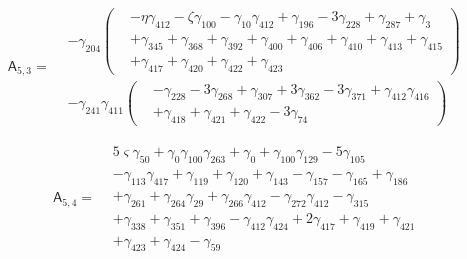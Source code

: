 \[\mathsf A_{5,3}=\begin{aligned}&- \gamma_{204} \left(\begin{aligned}&- \eta  \gamma_{412}- \zeta  \gamma_{100}- \gamma_{10} \gamma_{412}+ \gamma_{196}- 3 \gamma_{228}+ \gamma_{287}+ \gamma_{3}\\&+ \gamma_{345}+ \gamma_{368}+ \gamma_{392}+ \gamma_{400}+ \gamma_{406}+ \gamma_{410}+ \gamma_{413}+ \gamma_{415}\\&+ \gamma_{417}+ \gamma_{420}+ \gamma_{422}+ \gamma_{423}\end{aligned}\right)\\&- \gamma_{241} \gamma_{411} \left(\begin{aligned}&- \gamma_{228}- 3 \gamma_{268}+ \gamma_{307}+ 3 \gamma_{362}- 3 \gamma_{371}+ \gamma_{412} \gamma_{416}\\&+ \gamma_{418}+ \gamma_{421}+ \gamma_{422}- 3 \gamma_{74}\end{aligned}\right)\end{aligned}\]

\[\mathsf A_{5,4}=\begin{aligned}& 5 \varsigma  \gamma_{50}+ \gamma_{0} \gamma_{100} \gamma_{263}+ \gamma_{0}+ \gamma_{100} \gamma_{129}- 5 \gamma_{105}\\&- \gamma_{113} \gamma_{417}+ \gamma_{119}+ \gamma_{120}+ \gamma_{143}- \gamma_{157}- \gamma_{165}+ \gamma_{186}\\&+ \gamma_{261}+ \gamma_{264} \gamma_{29}+ \gamma_{266} \gamma_{412}- \gamma_{272} \gamma_{412}- \gamma_{315}\\&+ \gamma_{338}+ \gamma_{351}+ \gamma_{396}- \gamma_{412} \gamma_{424}+ 2 \gamma_{417}+ \gamma_{419}+ \gamma_{421}\\&+ \gamma_{423}+ \gamma_{424}- \gamma_{59}\end{aligned}\]
